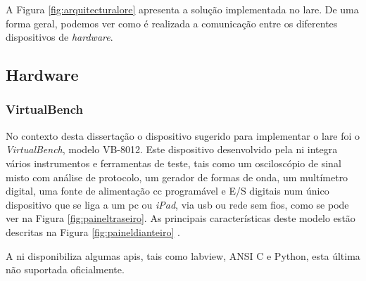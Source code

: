 A Figura {\ref{fig:arquitecturalore}} apresenta a solução implementada no \acrshort{lare}. De uma forma geral, podemos ver como é realizada a comunicação entre os diferentes dispositivos de \textit{hardware}.

\subsection{Hardware}
\label{sec:hardware}
\subsubsection{VirtualBench}
No contexto desta dissertação o dispositivo sugerido para implementar o \acrshort{lare} foi o \textit{VirtualBench}, modelo VB-8012. Este dispositivo desenvolvido pela \acrshort{ni} integra vários instrumentos e ferramentas de teste, tais como um osciloscópio de sinal misto com análise de protocolo, um gerador de formas de onda, um multímetro digital, uma fonte de alimentação \acrfull{cc} programável e E/S digitais num único dispositivo que se liga a um \acrshort{pc} ou \textit{iPad}, via \acrshort{usb} ou rede sem fios, como se pode ver na Figura \ref{fig:paineltraseiro}. As principais características deste modelo estão descritas na Figura \ref{fig:paineldianteiro} \cite{datasheetVirtualBench}.

A \acrshort{ni} disponibiliza algumas \acrshort{api}s, tais como \acrshort{labview}, ANSI C e Python, esta última não suportada oficialmente.

